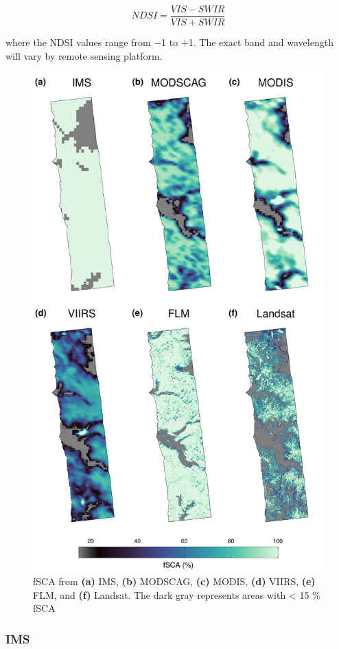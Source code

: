 \begin{equation}
NDSI = \frac{VIS - SWIR}{VIS + SWIR}
\end{equation}

\noindent where the NDSI values range from $-$1 to $+$1. The exact band and wavelength will vary by remote sensing platform. 

\begin{figure}[h]
\includegraphics[width=\textwidth]{figures/ch4_figs/fsca_usvar_v2.pdf}
\caption{fSCA from \textbf{(a)} IMS, \textbf{(b)} MODSCAG, \textbf{(c)} MODIS, \textbf{(d)} VIIRS, \textbf{(e)} FLM, and \textbf{(f)} Landsat. The dark gray represents areas with < 15 \% fSCA}
\end{figure}
\clearpage
\hypertarget{ch4-methods-3}{\subsubsection{IMS}\label{ch4-methods-3}}


